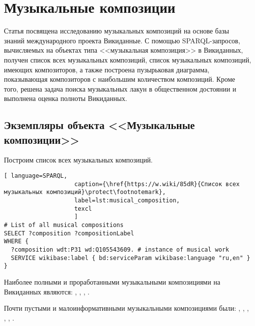 \chapter{Музыкальные композиции}
\label{ch:musical-composition}
Статья посвящена исследованию музыкальных композиций на основе базы знаний международного проекта Викиданные. С помощью SPARQL-запросов, вычисляемых на объектах типа <<музыкальная композиция>> в Викиданных, получен список всех музыкальных композиций, список музыкальных композиций, имеющих композиторов, а также построена пузырьковая диаграмма, показывающая композиторов с наибольшим количеством композиций. Кроме того, решена задача поиска музыкальных лакун в общественном достоянии и выполнена оценка полноты Викиданных.

\section{Экземпляры объекта <<Музыкальные композиции>>}


Построим список всех музыкальных композиций.

\begin{lstlisting}[ language=SPARQL,
                    caption={\href{https://w.wiki/85dR}{Список всех  музыкальных композиций}\protect\footnotemark},
                    label=lst:musical_composition,
                    texcl 
                    ]
# List of all musical compositions
SELECT ?composition ?compositionLabel 
WHERE {
  ?composition wdt:P31 wd:Q105543609. # instance of musical work
  SERVICE wikibase:label { bd:serviceParam wikibase:language "ru,en" }
}
\end{lstlisting}%

Наиболее полными и проработанными музыкальными композициями на Викиданных являются: , , , .

Почти пустыми и малоинформативными музыкальными композициями были: , , , , , .

